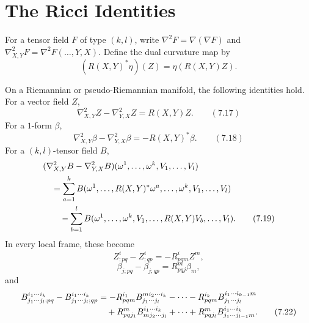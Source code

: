 \section{The Ricci Identities}

For a tensor field $F$ of type $(k,l)$, write
$\nabla^2F=\nabla(\nabla F)$ and
$\nabla^2_{X,Y}F=\nabla^2F(\ldots,Y,X)$. Define the dual curvature map by
\[
(R(X,Y)^*\eta)(Z)=\eta(R(X,Y)Z).
\]

\begin{theorem}
\label{thm:ricci-identities}

On a Riemannian or pseudo-Riemannian manifold, the following identities hold.
For a vector field $Z$,
\[
\nabla^2_{X,Y}Z-\nabla^2_{Y,X}Z=R(X,Y)Z.
\qquad (7.17)
\]
For a $1$-form $\beta$,
\[
\nabla^2_{X,Y}\beta-\nabla^2_{Y,X}\beta=-R(X,Y)^*\beta.
\qquad (7.18)
\]
For a $(k,l)$-tensor field $B$,
\begin{align}
&(\nabla^2_{X,Y}B-\nabla^2_{Y,X}B)
  (\omega^1,\ldots,\omega^k,V_1,\ldots,V_l)\notag\\
&\quad=\sum_{a=1}^k
B(\omega^1,\ldots,R(X,Y)^*\omega^a,\ldots,\omega^k,
  V_1,\ldots,V_l)\notag\\
&\qquad-\sum_{b=1}^l
B(\omega^1,\ldots,\omega^k,
  V_1,\ldots,R(X,Y)V_b,\ldots,V_l).
\tag{7.19}
\end{align}
In every local frame, these become
\begin{equation}
Z^i_{;pq}-Z^i_{;qp}=-R_{pqm}^iZ^m,
\tag{7.20}
\end{equation}
\begin{equation}
\beta_{j;pq}-\beta_{j;qp}=R_{pqj}^m\beta_m,
\tag{7.21}
\end{equation}
and
\begin{align}
B^{i_1\cdots i_k}_{j_1\cdots j_l;pq}
-B^{i_1\cdots i_k}_{j_1\cdots j_l;qp}
&=-R_{pqm}^{i_1}B^{m i_2\cdots i_k}_{j_1\cdots j_l}
-\cdots
-R_{pqm}^{i_k}B^{i_1\cdots i_{k-1}m}_{j_1\cdots j_l}
\notag\\
&\quad+R_{pqj_1}^mB^{i_1\cdots i_k}_{m j_2\cdots j_l}
+\cdots
+R_{pqj_l}^mB^{i_1\cdots i_k}_{j_1\cdots j_{l-1}m}.
\tag{7.22}
\end{align}
\end{theorem}

